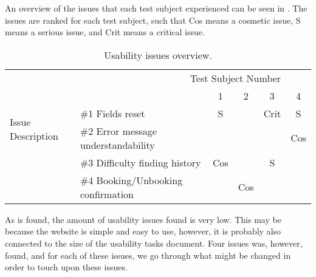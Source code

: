 An overview of the issues that each test subject experienced can be seen in .
The issues are ranked for each test subject, such that Cos means a cosmetic issue, S means a serious issue, and Crit means a critical issue.
\begin{table}[h]
	\centering
	\begin{tabular}{ll|cccc}
		\multicolumn{1}{c}{}&\multicolumn{4}{r}{Test Subject Number}&\\
		\multicolumn{2}{c|}{}&1&2&3&4\\
		\cline{2-6}
		\multirow{2}{*}{Issue Description}& {\#}1 Fields reset & S &  & Crit & S\\
		& {\#}2 Error message understandability &  &  &  & Cos\\
		& {\#}3 Difficulty finding history & Cos &  & S & \\
		& {\#}4 Booking/Unbooking confirmation &  & Cos &  & \\
	\end{tabular}
	\caption{Usability issues overview.}\label{tab:usabilityissues}
\end{table}

As is found, the amount of usability issues found is very low.
This may be because the website is simple and easy to use, however, it is probably also connected to the size of the usability tasks document.
Four issues was, however, found, and for each of these issues, we go through what might be changed in order to touch upon these issues.

